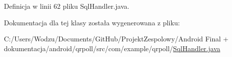 Definicja w linii 62 pliku Sql\+Handler.\+java.



Dokumentacja dla tej klasy została wygenerowana z pliku\+:\begin{DoxyCompactItemize}
\item 
C\+:/\+Users/\+Wodzu/\+Documents/\+Git\+Hub/\+Projekt\+Zespolowy/\+Android Final + dokumentacja/android/qrpoll/src/com/example/qrpoll/\hyperlink{_sql_handler_8java}{Sql\+Handler.\+java}\end{DoxyCompactItemize}
